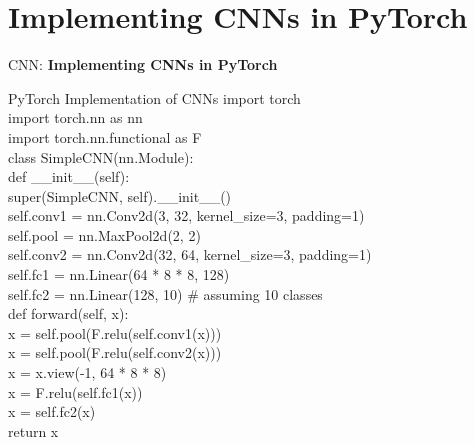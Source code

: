 \section{Implementing CNNs in PyTorch}
\begin{frame}{}
    \LARGE CNN: \textbf{Implementing CNNs in PyTorch}
\end{frame}

\begin{frame}[allowframebreaks]{PyTorch Implementation of CNNs}
    \ttfamily\footnotesize{
    import torch \\
    import torch.nn as nn \\
    import torch.nn.functional as F \\

    class SimpleCNN(nn.Module): \\
    \hspace{1em}    def \_\_init\_\_(self): \\
    \hspace{2em}         super(SimpleCNN, self).\_\_init\_\_() \\
    \hspace{2em}        self.conv1 = nn.Conv2d(3, 32, kernel\_size=3, padding=1) \\
    \hspace{2em}        self.pool = nn.MaxPool2d(2, 2) \\
    \hspace{2em}        self.conv2 = nn.Conv2d(32, 64, kernel\_size=3, padding=1) \\
    \hspace{2em}        self.fc1 = nn.Linear(64 * 8 * 8, 128) \\
    \hspace{2em}        self.fc2 = nn.Linear(128, 10)  \# assuming 10 classes \\

    \hspace{1em}    def forward(self, x): \\
    \hspace{2em}        x = self.pool(F.relu(self.conv1(x))) \\
    \hspace{2em}        x = self.pool(F.relu(self.conv2(x))) \\
    \hspace{2em}        x = x.view(-1, 64 * 8 * 8) \\
    \hspace{2em}        x = F.relu(self.fc1(x)) \\
    \hspace{2em}        x = self.fc2(x) \\
    \hspace{2em}        return x
    }


\end{frame}
